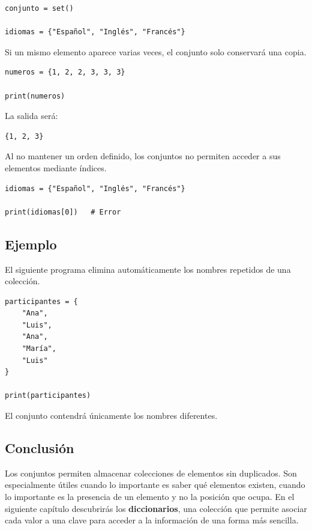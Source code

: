 \documentclass[11pt,a5paper,twoside]{book}
\begin{document}
\begin{tcolorbox}
\scriptsize
 \begin{verbatim}
conjunto = set()

idiomas = {"Español", "Inglés", "Francés"}
\end{verbatim}
\end{tcolorbox}
Si un mismo elemento aparece varias veces, el conjunto solo conservará una copia.


\begin{tcolorbox}
\scriptsize
 \begin{verbatim}
numeros = {1, 2, 2, 3, 3, 3}

print(numeros)
\end{verbatim}
\end{tcolorbox}
La salida será:


\begin{tcolorbox}
\scriptsize
 \begin{verbatim}
{1, 2, 3}
\end{verbatim}
\end{tcolorbox}
Al no mantener un orden definido, los conjuntos no permiten acceder a sus elementos mediante índices.


\begin{tcolorbox}
\scriptsize
 \begin{verbatim}
idiomas = {"Español", "Inglés", "Francés"}

print(idiomas[0])   # Error
\end{verbatim}
\end{tcolorbox}
\subsection{Ejemplo}
El siguiente programa elimina automáticamente los nombres repetidos de una colección.


\begin{tcolorbox}
\scriptsize
 \begin{verbatim}
participantes = {
    "Ana",
    "Luis",
    "Ana",
    "María",
    "Luis"
}

print(participantes)
\end{verbatim}
\end{tcolorbox}
El conjunto contendrá únicamente los nombres diferentes.
\subsection{Conclusión}
Los conjuntos permiten almacenar colecciones de elementos sin duplicados. Son especialmente útiles cuando lo importante es saber qué elementos existen, cuando lo importante es la presencia de un elemento y no la posición que ocupa.
En el siguiente capítulo descubrirás los \textbf{diccionarios}, una colección que permite asociar cada valor a una clave para acceder a la información de una forma más sencilla.
\end{document}
